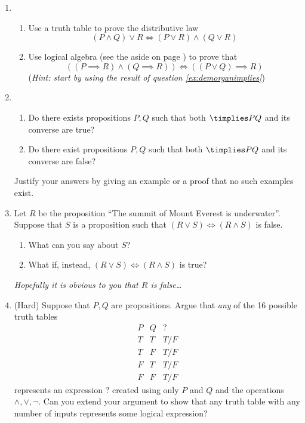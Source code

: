 \begin{enumerate}
	\item\begin{enumerate}
	  \item Use a truth table to prove the distributive law
		\[(P\wedge Q)\vee R\iff (P\vee R)\wedge(Q\vee R)\]
		\item Use logical algebra (see the aside on page \hyperlink{aside:logicalalglnk}{\pageref*{aside:logicalalg}}) to prove that
		\[\left((P\implies R)\wedge(Q\implies R)\right)\iff \left((P\vee Q)\implies R\right)\]
		(\emph{Hint: start by using the result of question \ref{ex:demorganimplies}})
	\end{enumerate}
	
  \item\begin{enumerate}
    	\item Do there exists propositions $P,Q$ such that both $\timplies PQ$ and its converse are true?
    	\item Do there exist propositions $P,Q$ such that both $\timplies PQ$ and its converse are false?
    \end{enumerate}
    Justify your answers by giving an example or a proof that no such examples exist.
    
  \item Let $R$ be the proposition ``The summit of Mount Everest is underwater''. Suppose that $S$ is a proposition such that $(R\vee S)\iff (R\wedge S)$ is false.
    \begin{enumerate}
      \item What can you say about $S$?
      \item What if, instead, $(R\vee S)\iff (R\wedge S)$ is true?
    \end{enumerate}
    \emph{Hopefully it is obvious to you that $R$ is false\ldots}
    
	\item (Hard) Suppose that $P,Q$ are propositions. Argue that \emph{any} of the 16 possible truth tables
	\[\begin{array}{cc|c}
	P&Q&?\\\hline
	T&T & T/F\\
	T&F & T/F\\
	F&T & T/F\\
	F&F & T/F
	\end{array}\]
	represents an expression ? created using only $P$ and $Q$ and the operations $\wedge,\vee,\neg$. Can you extend your argument to show that any truth table with any number of inputs represents some logical expression?
\end{enumerate}


